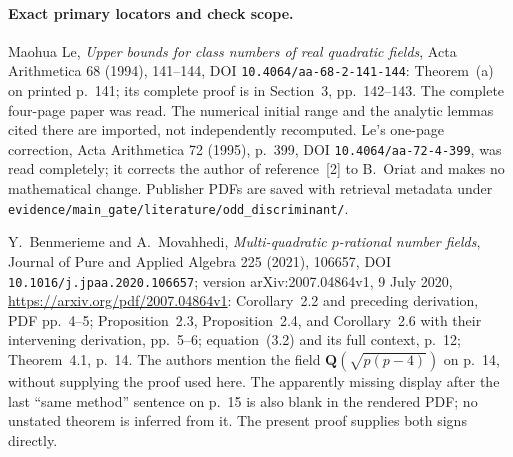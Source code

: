 \paragraph{Exact primary locators and check scope.}
Maohua Le, \emph{Upper bounds for class numbers of real quadratic
fields}, Acta Arithmetica 68 (1994), 141--144,
DOI \texttt{10.4064/aa-68-2-141-144}: Theorem~(a) on printed
p.~141; its complete proof is in Section~3, pp.~142--143.
The complete four-page paper was read.  The numerical initial
range and the analytic lemmas cited there are imported, not
independently recomputed.  Le's one-page correction, Acta
Arithmetica 72 (1995), p.~399,
DOI \texttt{10.4064/aa-72-4-399}, was read completely; it corrects
the author of reference~[2] to B.~Oriat and makes no mathematical
change.  Publisher PDFs are saved with retrieval metadata under
\texttt{evidence/main\_gate/literature/odd\_discriminant/}.

Y.~Benmerieme and A.~Movahhedi, \emph{Multi-quadratic $p$-rational
number fields}, Journal of Pure and Applied Algebra 225 (2021),
106657, DOI \texttt{10.1016/j.jpaa.2020.106657}; version
arXiv:2007.04864v1, 9 July 2020,
\url{https://arxiv.org/pdf/2007.04864v1}:
Corollary~2.2 and preceding derivation, PDF pp.~4--5;
Proposition~2.3, Proposition~2.4, and Corollary~2.6 with their
intervening derivation, pp.~5--6; equation~(3.2) and its full
context, p.~12; Theorem~4.1, p.~14.
The authors mention the field $\mathbf Q(\sqrt{p(p-4)})$ on
p.~14, without supplying the proof used here.  The apparently
missing display after the last ``same method'' sentence on p.~15
is also blank in the rendered PDF; no unstated theorem is inferred
from it.  The present proof supplies both signs directly.
